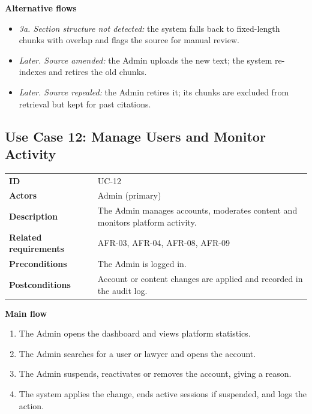 \textbf{Alternative flows}

\begin{itemize}
  \item \emph{3a. Section structure not detected:} the system falls back to fixed-length chunks with overlap and flags the source for manual review.
  \item \emph{Later. Source amended:} the Admin uploads the new text; the system re-indexes and retires the old chunks.
  \item \emph{Later. Source repealed:} the Admin retires it; its chunks are excluded from retrieval but kept for past citations.
\end{itemize}

\subsection{Use Case 12: Manage Users and Monitor Activity}

\begin{center}
\begin{tabular}{|L{4.31cm}|L{10.62cm}|}
\hline\headrow {} &  \\ \hline
\textbf{ID} & UC-12 \\ \hline
\textbf{Actors} & Admin (primary) \\ \hline
\textbf{Description} & The Admin manages accounts, moderates content and monitors platform activity. \\ \hline
\textbf{Related requirements} & AFR-03, AFR-04, AFR-08, AFR-09 \\ \hline
\textbf{Preconditions} & The Admin is logged in. \\ \hline
\textbf{Postconditions} & Account or content changes are applied and recorded in the audit log. \\ \hline
\end{tabular}
\end{center}

\textbf{Main flow}

\begin{enumerate}
  \item The Admin opens the dashboard and views platform statistics.
  \item The Admin searches for a user or lawyer and opens the account.
  \item The Admin suspends, reactivates or removes the account, giving a reason.
  \item The system applies the change, ends active sessions if suspended, and logs the action.
\end{enumerate}

